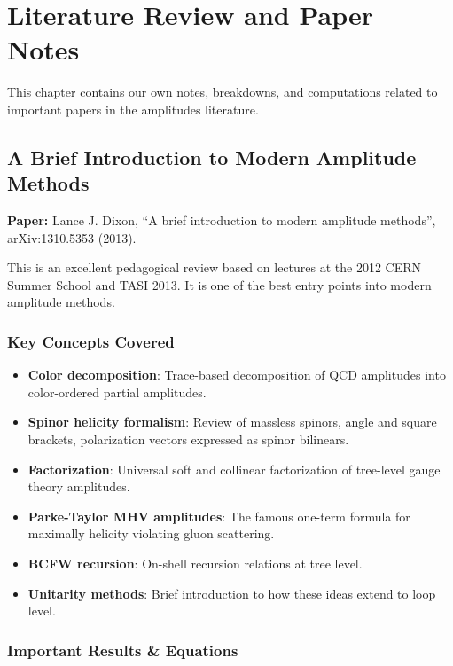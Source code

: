 
\chapter{Literature Review and Paper Notes}
\label{chap:literature-review}

This chapter contains our own notes, breakdowns, and computations related to important papers in the amplitudes literature.

\section{A Brief Introduction to Modern Amplitude Methods}
\label{sec:dixon-2013}

\textbf{Paper:} Lance J. Dixon, ``A brief introduction to modern amplitude methods'', arXiv:1310.5353 (2013).

This is an excellent pedagogical review based on lectures at the 2012 CERN Summer School and TASI 2013. It is one of the best entry points into modern amplitude methods.

\subsection{Key Concepts Covered}

\begin{itemize}
\item \textbf{Color decomposition}: Trace-based decomposition of QCD amplitudes into color-ordered partial amplitudes.
\item \textbf{Spinor helicity formalism}: Review of massless spinors, angle and square brackets, polarization vectors expressed as spinor bilinears.
\item \textbf{Factorization}: Universal soft and collinear factorization of tree-level gauge theory amplitudes.
\item \textbf{Parke-Taylor MHV amplitudes}: The famous one-term formula for maximally helicity violating gluon scattering.
\item \textbf{BCFW recursion}: On-shell recursion relations at tree level.
\item \textbf{Unitarity methods}: Brief introduction to how these ideas extend to loop level.
\end{itemize}

\subsection{Important Results \& Equations}

